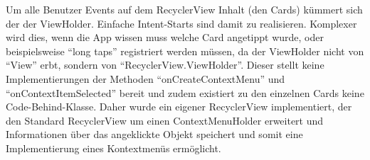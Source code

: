 Um alle Benutzer Events auf dem RecyclerView Inhalt (den Cards) kümmert sich der der ViewHolder. Einfache Intent-Starts sind damit zu realisieren. Komplexer wird dies, wenn die App wissen muss welche Card angetippt wurde, oder beispielsweise \enquote{long taps} registriert werden müssen, da der ViewHolder nicht von \enquote{View} erbt, sondern von \enquote{RecyclerView.ViewHolder}. Dieser stellt keine Implementierungen der Methoden \enquote{onCreateContextMenu} und \enquote{onContextItemSelected} bereit und zudem existiert zu den einzelnen Cards keine Code-Behind-Klasse. Daher wurde ein eigener RecyclerView implementiert, der den Standard RecyclerView um einen ContextMenuHolder erweitert und Informationen über das angeklickte Objekt speichert und somit eine Implementierung eines Kontextmenüs ermöglicht.